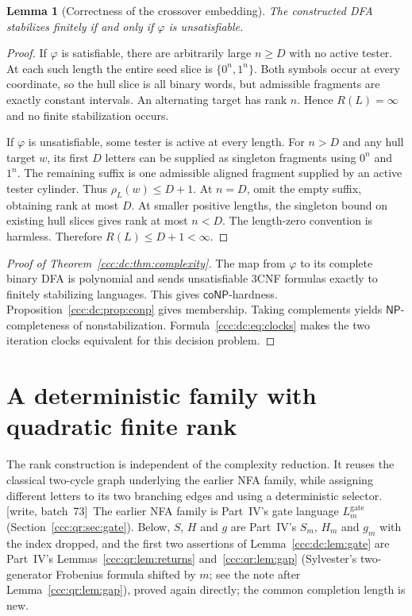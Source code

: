 \documentclass[11pt,letterpaper]{article}
\newtheorem{lemma}[theorem]{Lemma}
\theoremstyle{definition}
\theoremstyle{remark}
\newcommand{\rank}{\rho}
\newcommand{\Lgate}[1]{L^{\mathrm{gate}}_{#1}}
\newcommand{\wsevthree}{\textup{[write, batch~73]}}
\newcommand{\NP}{\mathsf{NP}}
\newcommand{\coNP}{\mathsf{coNP}}
\begin{document}
\begin{lemma}[Correctness of the crossover embedding]\label{ccc:dc:lem:reduction}
The constructed DFA stabilizes finitely if and only if $\varphi$ is unsatisfiable.
\end{lemma}
\begin{proof}
If $\varphi$ is satisfiable, there are arbitrarily large $n\ge D$ with no active tester. At each such length the entire seed slice is $\{0^n,1^n\}$. Both symbols occur at every coordinate, so the hull slice is all binary words, but admissible fragments are exactly constant intervals. An alternating target has rank $n$. Hence $R(L)=\infty$ and no finite stabilization occurs.

If $\varphi$ is unsatisfiable, some tester is active at every length. For $n>D$ and any hull target $w$, its first $D$ letters can be supplied as singleton fragments using $0^n$ and $1^n$. The remaining suffix is one admissible aligned fragment supplied by an active tester cylinder. Thus $\rank_L(w)\le D+1$. At $n=D$, omit the empty suffix, obtaining rank at most $D$. At smaller positive lengths, the singleton bound on existing hull slices gives rank at most $n<D$. The length-zero convention is harmless. Therefore $R(L)\le D+1<\infty$.
\end{proof}

\begin{proof}[Proof of Theorem~\ref{ccc:dc:thm:complexity}]
The map from $\varphi$ to its complete binary DFA is polynomial and sends unsatisfiable 3CNF formulas exactly to finitely stabilizing languages. This gives $\coNP$-hardness. Proposition~\ref{ccc:dc:prop:conp} gives membership. Taking complements yields $\NP$-completeness of nonstabilization. Formula~\eqref{ccc:dc:eq:clocks} makes the two iteration clocks equivalent for this decision problem.
\end{proof}

\section{A deterministic family with quadratic finite rank}\label{ccc:dc:sec:family}

The rank construction is independent of the complexity reduction. It reuses the classical two-cycle graph underlying the earlier NFA family, while assigning different letters to its two branching edges and using a deterministic selector.
\wsevthree\ The earlier NFA family is Part~IV's gate language $\Lgate m$
(Section~\ref{ccc:qr:sec:gate}). Below, $S$, $H$ and $g$ are Part~IV's $S_m$,
$H_m$ and $g_m$ with the index dropped, and the first two assertions of
Lemma~\ref{ccc:dc:lem:gate} are Part~IV's Lemmas~\ref{ccc:qr:lem:returns}
and~\ref{ccc:qr:lem:gap} (Sylvester's two-generator Frobenius formula shifted
by $m$; see the note after Lemma~\ref{ccc:qr:lem:gap}), proved again directly;
the common completion length is new.
\end{document}

